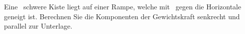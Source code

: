 Eine \mKiO\ schwere Kiste liegt auf einer Rampe, welche mit \wiO\ gegen die Horizontale geneigt ist. Berechnen Sie die Komponenten der Gewichtskraft senkrecht und parallel zur Unterlage.
